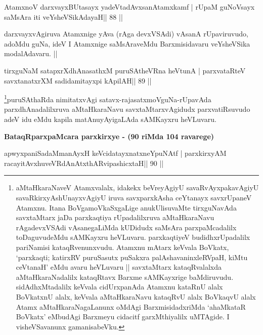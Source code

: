 
\begin{shl}
AtamxnoV darxvayxBUtasayx yadeVtadAvxsanAtamxkamf |
rUpaM guNoV\s sayx saMsAra iti veYsheVSikAdayaH\hfill || 88 ||
\end{shl}

\begin{artha}
darxvayxvAgiruva Atamxnige yAva (rAga devxVSAdi) vAsanA rUpaviruvudo,
adoMdu guNa, ideV I Atamxnige saMsAraveMdu Barxmisidavaru veYsheVSika
modalAdavaru. || 
\end{artha}


\begin{shl}
tirxguNaM satapxrXdhAnasathxM puruSAtheVRna heVtunA |
parxvataRteV savxtanatxrXM sadidamitayxpi kApilAH\hfill || 89 ||
\end{shl}

\begin{artha}
\footnote{aMtaHkaraNaveV Atamxvalalx, idakekx beVreyAgiyU 
savaRvAyxpakavAgiyU savaRkirxyAshUnayxvAgiyU iruva savxparxkAsha ceYtanayx
  savxrUpaneV Atamxnu. Itana BoVgamoVkaSxgaLige anukUlisuvaMte
  tirxguNavAda savxtaMtarx jaDa parxkaqtiya rUpadalilxruva 
  aMtaHkaraNavu rAgadevxVSAdi vAsanegaLiMda kUDidudx saMsAra parxpaMcadalilx
toDaguvudeMdu sAMKayxru heVLuvaru. parxkaqtiyeV budidhxrUpadalilx
pariNamisi kataqRvenunxvudu. Atamxnu mAtarx keVvala BoVkatx,
`parxkaqti; katirxRV puruSasutx puSakxra palAshavaninxleRVpaH, kiMtu
ceVtanaH' eMdu avaru heVLuvaru || savxtaMtarx kataqRvalalxda
aMtaHkaraNadalilx kataqRtavx Barxme sAMKayxrige baMdiruvudu.
sidAdhxMtadalilx keVvala cidUrxpanAda Atamxnu kataRnU alalx BoVkatxnU
alalx, keVvala aMtaHkaraNavu kataqRvU alalx BoVkaqvU alalx Atamx
aMtaHkaraNagaLanunx oMdAgi BarxmisidadxriMda `ahaMkataR BoVkatx'
eMbudAgi Barxmeyu cidacitf garxMthiyalilx uMTAgide. I visheVSavanunx gamanisabeVku.}puruSAthaRda nimitatxvAgi
satavx-rajasatxmoVguNa-rUpavAda parxdhAnadalilxruva aMtaHkaraNavu
savxtaMtarxvAgidudx parxvatiRsuvudo adeV idu eMdu kapila
matAnuyAyigaLAda sAMKayxru heVLuvaru.
\end{artha}

{\centerline{\textbf{BataqRparxpaMcara parxkirxye - (90 riMda 104 ravarege)}}}

\medskip

\begin{shl}
apwyxpaniSadaMmanAyxH keVcidatayxnatxneYpuNAtf |
parxkirxyAM racayitAvx\s\s huveVRdAnAtxthARvipashicxtaH\hfill || 90 ||
\end{shl}

